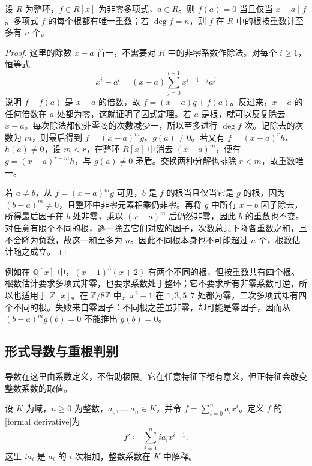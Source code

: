 \begin{proposition}[因式定理与根数估计]\label{b1:prop:factor-root}
	设 \(R\) 为整环，\(f\in R[x]\) 为非零多项式，\(a\in R\)。则 \(f(a)=0\) 当且仅当 \(x-a\mid f\)。多项式 \(f\) 的每个根都有唯一重数；若 \(\deg f=n\)，则 \(f\) 在 \(R\) 中的根按重数计至多有 \(n\) 个。
\end{proposition}
\begin{proof}
	这里的除数 \(x-a\) 首一，不需要对 \(R\) 中的非零系数作除法。对每个 \(i\ge1\)，恒等式
	\[
		x^i-a^i=(x-a)\sum_{j=0}^{i-1}x^{i-1-j}a^j
	\]
	说明 \(f-f(a)\) 是 \(x-a\) 的倍数，故 \(f=(x-a)q+f(a)\)。反过来，\(x-a\) 的任何倍数在 \(a\) 处都为零，这就证明了因式定理。若 \(a\) 是根，就可以反复除去 \(x-a\)。每次除法都使非零商的次数减少一，所以至多进行 \(\deg f\) 次。记除去的次数为 \(m\)，则最后得到 \(f=(x-a)^m g\)、\(g(a)\ne0\)。若又有 \(f=(x-a)^r h\)、\(h(a)\ne0\)，设 \(m<r\)，在整环 \(R[x]\) 中消去 \((x-a)^m\)，便有 \(g=(x-a)^{r-m}h\)，与 \(g(a)\ne0\) 矛盾。交换两种分解也排除 \(r<m\)，故重数唯一。

	若 \(a\ne b\)，从 \(f=(x-a)^m g\) 可见，\(b\) 是 \(f\) 的根当且仅当它是 \(g\) 的根，因为 \((b-a)^m\ne0\)，且整环中非零元素相乘仍非零。再将 \(g\) 中所有 \(x-b\) 因子除去，所得最后因子在 \(b\) 处非零，乘以 \((x-a)^m\) 后仍然非零，因此 \(b\) 的重数也不变。对任意有限个不同的根，逐一除去它们对应的因子，次数总共下降各重数之和，且不会降为负数，故这一和至多为 \(n\)。因此不同根本身也不可能超过 \(n\) 个，根数估计随之成立。
\end{proof}

例如在 \(\mathbb Q[x]\) 中，\((x-1)^3(x+2)\) 有两个不同的根，但按重数共有四个根。根数估计要求多项式非零，也要求系数处于整环；它不要求所有非零系数可逆，所以也适用于 \(\mathbb Z[x]\)。在 \(\mathbb Z/8\mathbb Z\) 中，\(x^2-1\) 在 \(\bar1,\bar3,\bar5,\bar7\) 处都为零，二次多项式却有四个不同的根。失败来自零因子：不同根之差虽非零，却可能是零因子，因而从 \((b-a)^m g(b)=0\) 不能推出 \(g(b)=0\)。

\subsection{形式导数与重根判别}
\label{b1:subsec:1201:02}

导数在这里由系数定义，不借助极限。它在任意特征下都有意义，但正特征会改变整数系数的取值。

\begin{definition}\label{b1:def:formal-derivative}
	设 \(K\) 为域，\(n\geq0\) 为整数，\(a_0,\ldots,a_n\in K\)，并令 \(f=\sum_{i=0}^n a_i x^i\)。定义 \(f\) 的[formal derivative]为
	\[
		f'\coloneqq\sum_{i=1}^n i a_i x^{i-1}.
	\]
	这里 \(i a_i\) 是 \(a_i\) 的 \(i\) 次相加，整数系数在 \(K\) 中解释。
\end{definition}


